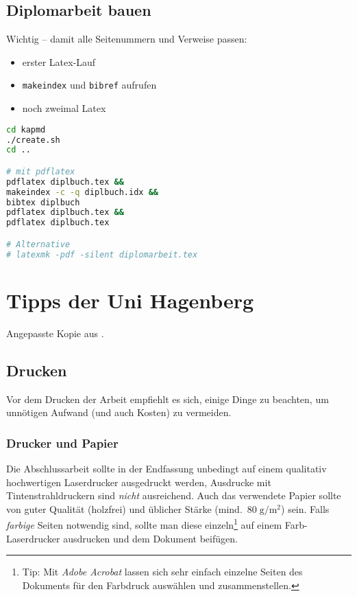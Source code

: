 \hypertarget{diplomarbeit-bauen}{%
\subsection{Diplomarbeit bauen}\label{diplomarbeit-bauen}}

Wichtig -- damit alle Seitenummern und Verweise passen:

\begin{itemize}
\tightlist
\item
  erster Latex-Lauf
\item
  \passthrough{\lstinline!makeindex!} und
  \passthrough{\lstinline!bibref!} aufrufen
\item
  noch zweimal Latex
\end{itemize}

\begin{lstlisting}[language=bash]
cd kapmd
./create.sh
cd ..

# mit pdflatex
pdflatex diplbuch.tex &&
makeindex -c -q diplbuch.idx &&
bibtex diplbuch
pdflatex diplbuch.tex &&
pdflatex diplbuch.tex

# Alternative
# latexmk -pdf -silent diplomarbeit.tex
\end{lstlisting}

\hypertarget{tipps-der-uni-hagenberg}{%
\section{Tipps der Uni Hagenberg}\label{tipps-der-uni-hagenberg}}

Angepasste Kopie aus \citep{hagenberg}.

\hypertarget{drucken}{%
\subsection{Drucken}\label{drucken}}

Vor dem Drucken der Arbeit empfiehlt es sich, einige Dinge zu beachten,
um unnötigen Aufwand (und auch Kosten) zu vermeiden.

\hypertarget{drucker-und-papier}{%
\subsubsection{Drucker und Papier}\label{drucker-und-papier}}

Die Abschlussarbeit sollte in der Endfassung unbedingt auf einem
qualitativ hochwertigen Laserdrucker ausgedruckt werden, Ausdrucke mit
Tintenstrahldruckern sind \emph{nicht} ausreichend. Auch das verwendete
Papier sollte von guter Qualität (holzfrei) und üblicher Stärke
(mind.~\(80\; {\mathrm g} / {\mathrm m}^2\)) sein. Falls \emph{farbige}
Seiten notwendig sind, sollte man diese einzeln\footnote{Tip: Mit
  \emph{Adobe Acrobat} lassen sich sehr einfach einzelne Seiten des
  Dokuments für den Farbdruck auswählen und zusammenstellen.} auf einem
Farb-Laserdrucker ausdrucken und dem Dokument beifügen.

